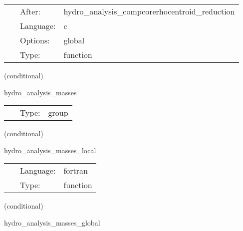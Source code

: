  \begin{tabular*}{160mm}{cll} 
~ & After:  & hydro\_analysis\_compcorerhocentroid\_reduction \\ 
~ & Language:  & c \\ 
~ & Options:  & global \\ 
~ & Type:  & function \\ 
\end{tabular*} 


\vspace{5mm}

   (conditional) 

\hspace{5mm} hydro\_analysis\_masses 

\hspace{5mm}{\it computation of rest masses contained within given radii } 


\hspace{5mm}

 \begin{tabular*}{160mm}{cll} 
~ & Type:  & group \\ 
\end{tabular*} 


\vspace{5mm}

   (conditional) 

\hspace{5mm} hydro\_analysis\_masses\_local 

\hspace{5mm}{\it rest masses within given radii, local calculations } 


\hspace{5mm}

 \begin{tabular*}{160mm}{cll} 
~ & Language:  & fortran \\ 
~ & Type:  & function \\ 
\end{tabular*} 


\vspace{5mm}

   (conditional) 

\hspace{5mm} hydro\_analysis\_masses\_global 

\hspace{5mm}{\it rest masses within given radii, reduction operation } 


\hspace{5mm}


